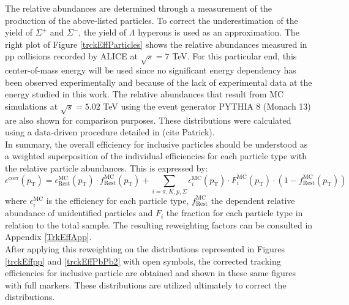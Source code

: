 \documentclass[12pt,a4paper]{report}
\begin{document}
The relative abundances are determined through a measurement of the production of the above-listed particles. To correct the underestimation of the yield of $\Sigma^{+}$ and $\Sigma^{-}$, the yield of $\Lambda$ hyperons is used as an approximation. The right plot of Figure \ref{trckEffParticles} shows the relative abundances measured in pp collisions recorded by ALICE at $\sqrt{s} = 7$ TeV. For this particular end, this center-of-mass energy will be used since no significant energy dependency has been observed experimentally and because of the lack of experimental data at the energy studied in this work. The relative abundances that result from MC simulations at $\sqrt{s} = 5.02$ TeV using the event generator PYTHIA 8 (Monach 13) are also shown for comparison purposes. These distributions were calculated using a data-driven procedure detailed in (cite Patrick). \\
In summary, the overall efficiency for inclusive particles should be understood as a weighted superposition of the individual efficiencies for each particle type with the relative particle abundances. This is expressed by:
\begin{equation}
\epsilon^\text{corr}(p_\text{T}) = \epsilon^\text{MC}_\text{Rest}(p_\text{T})  \cdot f^\text{MC}_\text{Rest}(p_\text{T}) + \sum_{i = \pi, K, p, \Sigma}  \epsilon^\text{MC}_i(p_\text{T})  \cdot F_i^\text{MC}(p_\text{T})\cdot (1-f^\text{MC}_\text{Rest}(p_\text{T}))
\end{equation}
where $\epsilon^\text{MC}_i$ is the efficiency for each particle type, $ f^\text{MC}_\text{Rest}$ the \pt dependent relative abundance of unidentified particles and $F_i$ the fraction for each particle type in relation to the total sample. The resulting reweighting factors can be consulted in Appendix \ref{TrkEffApp}. \\
After applying this reweighting on the distributions represented in Figures \ref{trckEffpp} and \ref{trckEffPbPb2} with open symbols, the corrected tracking efficiencies for inclusive particle are obtained and shown in these same figures with full markers. These distributions are utilized ultimately to correct the \pt distributions. 
\end{document}
